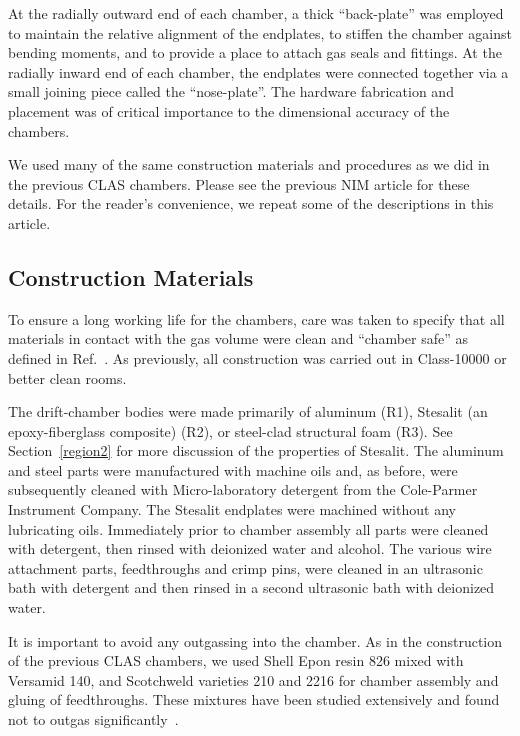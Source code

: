 At the radially outward end of each chamber, a thick ``back-plate'' was 
employed to maintain the relative 
alignment of the endplates, to stiffen the chamber against bending moments, 
and to provide a place to attach gas seals and fittings. At the radially inward 
end of each chamber, the endplates were connected together via a small joining 
piece called the ``nose-plate''.  The hardware fabrication and placement 
was of critical importance to the dimensional accuracy of the chambers.

We used many of the same construction materials and procedures as we did
in the previous CLAS chambers.  Please see the previous NIM article \cite{dcnim} 
for these details.  For the reader's convenience, we repeat some of the descriptions
in this article.

\subsection{Construction Materials}
\label{materials}

To ensure a long working life for the chambers, care was taken to 
specify that all materials in contact with the gas volume were clean and ``chamber 
safe'' as defined in Ref.~\cite{kadyk}.  As previously, all construction was carried out in 
Class-10000 or better clean rooms.

The drift-chamber bodies were made primarily of aluminum (R1), Stesalit (an epoxy-fiberglass composite) (R2),
or steel-clad structural foam (R3).  See Section~\ref{region2} for more discussion
of the properties of Stesalit.  The aluminum and steel parts were 
manufactured with machine oils and, as before, were subsequently cleaned with  
Micro-laboratory detergent from the Cole-Parmer Instrument Company.  The 
Stesalit endplates were machined without any lubricating oils.  Immediately 
prior to chamber assembly all parts were cleaned with detergent, then rinsed with
deionized water and alcohol.  The various wire attachment parts, feedthroughs and
crimp pins, were cleaned in an ultrasonic bath 
with detergent and then rinsed in a second ultrasonic bath with deionized water.

It is important to avoid any outgassing into the chamber.  As in the construction
of the previous CLAS chambers, we used Shell Epon resin 826 mixed with Versamid 140, and 
Scotchweld varieties 210 and 2216 for chamber assembly and gluing of feedthroughs.  These mixtures have been 
studied extensively and found not to outgas significantly~\cite{nasa}.

